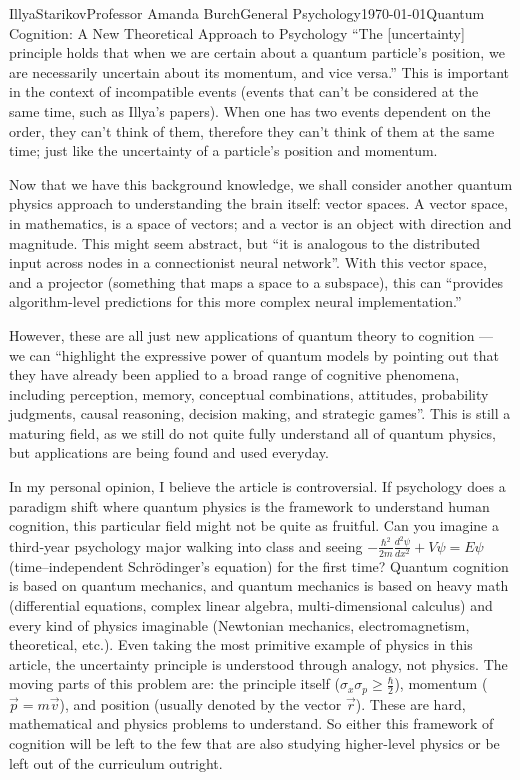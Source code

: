 \documentclass[12pt,letterpaper]{article}
\begin{document}
\begin{mla}{Illya}{Starikov}{Professor Amanda Burch}{General Psychology}{\today}{Quantum Cognition: A New Theoretical Approach to Psychology}
``The [uncertainty] principle holds that when we are certain about a quantum particle’s position, we are necessarily uncertain about its momentum, and vice versa.'' This is important in the context of incompatible events (events that can't be considered at the same time, such as Illya's papers). When one has two events dependent on the order, they can't think of them, therefore they can't think of them at the same time; just like the uncertainty of a particle's position and momentum.

Now that we have this background knowledge, we shall consider another quantum physics approach to understanding the brain itself: vector spaces. A vector space, in mathematics, is a space of vectors; and a vector is an object with direction and magnitude. This might seem abstract, but ``it is analogous to the distributed input across nodes in a connectionist neural network''. With this vector space, and a projector (something that maps a space to a subspace), this can ``provides algorithm-level predictions for this more complex neural implementation.''

However, these are all just new applications of quantum theory to cognition --- we can ``highlight the expressive power of quantum models by pointing out that they have already been applied to a broad range of cognitive phenomena, including perception, memory, conceptual combinations, attitudes, probability judgments, causal reasoning, decision making, and strategic games''. This is still a maturing field, as we still do not quite fully understand all of quantum physics, but applications are being found and used everyday.

In my personal opinion, I believe the article is controversial. If psychology does a paradigm shift where quantum physics is the framework to understand human cognition, this particular field might not be quite as fruitful. Can you imagine a third-year psychology major walking into class and seeing $-\frac{\hbar^2}{2m} \frac{d^2 \psi}{dx^2} + V\psi = E\psi$ (time--independent Schr\"odinger's equation) for the first time? Quantum cognition is based on quantum mechanics, and quantum mechanics is based on heavy math (differential equations, complex linear algebra, multi-dimensional calculus) and every kind of physics imaginable (Newtonian mechanics, electromagnetism, theoretical, etc.). Even taking the most primitive example of physics in this article, the uncertainty principle is understood through analogy, not physics. The moving parts of this problem are: the principle itself ($\sigma _x \sigma _p \geq \frac{\hbar}{2}$), momentum ($\vec{p} = m \vec{v}$), and position (usually denoted by the vector $\vec{r}$). These are hard, mathematical and physics problems to understand. So either this framework of cognition will be left to the few that are also studying higher-level physics or be left out of the curriculum outright.


\end{mla}
\end{document}
